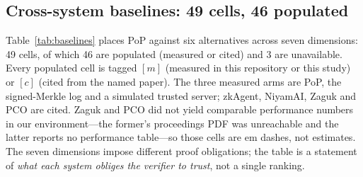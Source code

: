 \documentclass[10pt,journal,compsoc]{IEEEtran}
\begin{document}
\subsection{Cross-system baselines: 49 cells, 46 populated}
\label{sec:eval-baselines}

Table~\ref{tab:baselines} places PoP against six alternatives across seven
dimensions: 49 cells, of which 46 are populated (measured or cited) and 3 are
unavailable. Every populated cell is tagged $[m]$ (measured in this repository
or this study) or $[c]$ (cited from the named paper). The three measured arms are
PoP, the signed-Merkle log and a simulated trusted server; zkAgent, NiyamAI,
Zaguk and PCO are cited. Zaguk and PCO did not yield comparable performance
numbers in our environment---the former's proceedings PDF was unreachable and
the latter reports no performance table---so those cells are em dashes, not
estimates. The seven dimensions impose different proof obligations; the table is
a statement of \emph{what each system obliges the verifier to trust}, not a
single ranking.
\end{document}
